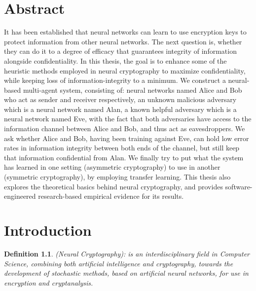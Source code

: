 \documentclass[a4paper, 12pt]{report}
\newtheorem{definition}{Definition}
\begin{document}
\chapter*{Abstract}
\begin{center}
	\begin{minipage}{0.8\textwidth}
			\justify
			It has been established that neural networks can learn to use encryption keys to protect information from other neural networks.
			The next question is, whether they can do it to a degree of efficacy that guarantees integrity of information alongside confidentiality.
			In this thesis, the goal is to enhance some of the heuristic methods employed in neural cryptography to maximize confidentiality, while keeping loss of information-integrity to a minimum.
			We construct a neural-based multi-agent system, consisting of: neural networks named Alice and Bob who act as sender and receiver respectively, an unknown malicious adversary which is a neural network named Alan, a known helpful adversary which is a neural network named Eve, with the fact that both adversaries have access to the information channel between Alice and Bob, and thus act as eavesdroppers. 
			We ask whether Alice and Bob, having been training against Eve, can hold low error rates in information integrity between both ends of the channel, but still keep that information confidential from Alan.
			We finally try to put what the system has learned in one setting (asymmetric cryptography) to use in another (symmetric cryptography), by employing transfer learning.
			This thesis also explores the theoretical basics behind neural cryptography, and provides software-engineered research-based empirical evidence for its results.
	\end{minipage}
\end{center}
\newpage
\begin{spacing}{0.05}
\tableofcontents
\end{spacing}
\newpage
\chapter{Introduction}\label{sec:introduction}
\begin{definition}
	(Neural Cryptography): is an interdisciplinary field in Computer Science, combining both artificial intelligence and cryptography, towards the development of stochastic methods, based on artificial neural networks, for use in encryption and cryptanalysis.
\end{definition}
\end{document}
